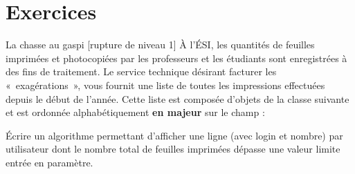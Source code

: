 	

\section{Exercices}


\begin{Exercice}{La chasse au gaspi [rupture de niveau 1]}
	À l’ÉSI, les quantités de feuilles imprimées et photocopiées 
	par les professeurs et les étudiants sont enregistrées à des fins de traitement.
	Le service technique désirant facturer les «~exagérations~», 
	vous fournit une liste de toutes les impressions effectuées depuis le début de l'année.
	Cette liste est composée d'objets de la classe  suivante 
	et est ordonnée alphabétiquement \textbf{en majeur} sur le champ   :

	\begin{algo}
	\end{algo}

	Écrire un algorithme permettant d'afficher une ligne 
	(avec login et nombre) par
	utilisateur dont le nombre total de feuilles imprimées dépasse une
	valeur limite entrée en paramètre. 
\end{Exercice}
\begin{Solution}
  \begin{algo}
  \end{algo}
\end{Solution}

